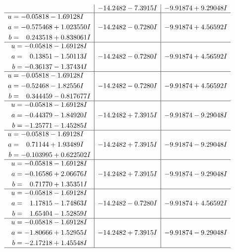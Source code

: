 \documentclass[1p]{elsarticle_modified}
\theoremstyle{definition}
\begin{document}
$$\begin{array}{c|c|c}
 & -14.2482 - 7.3915 I & -9.91874 + 9.29048 I \\ \hline\begin{aligned}
u &= -0.05818 - 1.69128 I \\
a &= -0.575468 + 1.023550 I \\
b &= \phantom{-}0.243518 + 0.838061 I\end{aligned}
 & -14.2482 - 0.7280 I & -9.91874 + 4.56592 I \\ \hline\begin{aligned}
u &= -0.05818 - 1.69128 I \\
a &= \phantom{-}0.13851 - 1.50113 I \\
b &= -0.36137 - 1.37434 I\end{aligned}
 & -14.2482 - 0.7280 I & -9.91874 + 4.56592 I \\ \hline\begin{aligned}
u &= -0.05818 - 1.69128 I \\
a &= -0.52468 - 1.82556 I \\
b &= \phantom{-}0.344459 - 0.817677 I\end{aligned}
 & -14.2482 - 0.7280 I & -9.91874 + 4.56592 I \\ \hline\begin{aligned}
u &= -0.05818 - 1.69128 I \\
a &= -0.44379 - 1.84920 I \\
b &= -1.25771 - 1.45285 I\end{aligned}
 & -14.2482 + 7.3915 I & -9.91874 - 9.29048 I \\ \hline\begin{aligned}
u &= -0.05818 - 1.69128 I \\
a &= \phantom{-}0.71144 + 1.93489 I \\
b &= -0.103995 + 0.622502 I\end{aligned}
 & -14.2482 + 7.3915 I & -9.91874 - 9.29048 I \\ \hline\begin{aligned}
u &= -0.05818 - 1.69128 I \\
a &= -0.16586 + 2.06676 I \\
b &= \phantom{-}0.71770 + 1.35351 I\end{aligned}
 & -14.2482 + 7.3915 I & -9.91874 - 9.29048 I \\ \hline\begin{aligned}
u &= -0.05818 - 1.69128 I \\
a &= \phantom{-}1.17815 - 1.74863 I \\
b &= \phantom{-}1.65404 - 1.52859 I\end{aligned}
 & -14.2482 - 0.7280 I & -9.91874 + 4.56592 I \\ \hline\begin{aligned}
u &= -0.05818 - 1.69128 I \\
a &= -1.80666 + 1.52955 I \\
b &= -2.17218 + 1.45548 I\end{aligned}
 & -14.2482 + 7.3915 I & -9.91874 - 9.29048 I\\
 \hline 
 \end{array}$$\newpage\newpage\renewcommand{\arraystretch}{1}
\end{document}
